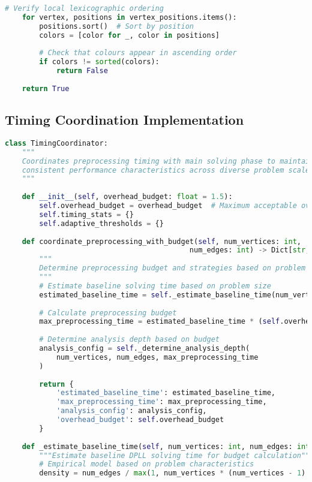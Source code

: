 \begin{lstlisting}[language=Python, caption=Symmetry Breaking Integration with Graph-Aware Ordering]
    # Verify local lexicographic ordering
    for vertex, positions in vertex_positions.items():
        positions.sort()  # Sort by position
        colors = [color for _, color in positions]
        
        # Check that colours appear in ascending order
        if colors != sorted(colors):
            return False
    
    return True
\end{lstlisting}

\subsection{Timing Coordination Implementation}
\label{appendix:timing-coordination}

\begin{lstlisting}[language=Python, caption=Adaptive Timing Coordination for Consistent Overhead]
class TimingCoordinator:
    """
    Coordinates preprocessing timing with main solving phase to maintain
    consistent performance characteristics across diverse problem scales.
    """
    
    def __init__(self, overhead_budget: float = 1.5):
        self.overhead_budget = overhead_budget  # Maximum acceptable overhead factor
        self.timing_stats = {}
        self.adaptive_thresholds = {}
    
    def coordinate_preprocessing_with_budget(self, num_vertices: int, 
                                           num_edges: int) -> Dict[str, Any]:
        """
        Determine preprocessing budget and strategies based on problem characteristics.
        """
        # Estimate baseline solving time based on problem size
        estimated_baseline_time = self._estimate_baseline_time(num_vertices, num_edges)
        
        # Calculate preprocessing budget
        max_preprocessing_time = estimated_baseline_time * (self.overhead_budget - 1.0)
        
        # Determine analysis depth based on budget
        analysis_config = self._determine_analysis_depth(
            num_vertices, num_edges, max_preprocessing_time
        )
        
        return {
            'estimated_baseline_time': estimated_baseline_time,
            'max_preprocessing_time': max_preprocessing_time,
            'analysis_config': analysis_config,
            'overhead_budget': self.overhead_budget
        }
    
    def _estimate_baseline_time(self, num_vertices: int, num_edges: int) -> float:
        """Estimate baseline DPLL solving time for budget calculation"""
        # Empirical model based on problem characteristics
        density = num_edges / max(1, num_vertices * (num_vertices - 1) // 2)
        

\end{lstlisting}
